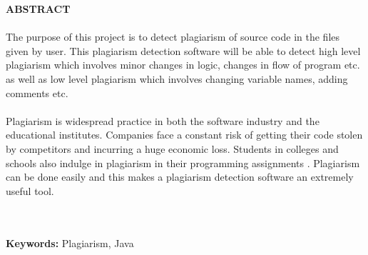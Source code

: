 \begin{center}
\thispagestyle{empty}
\vspace{2cm}
\LARGE{\textbf{ABSTRACT}}\\[1.0cm]
\end{center}
\thispagestyle{empty}
\large{\paragraph{}The purpose of this project is to detect plagiarism of source code in the files given by user. This plagiarism detection software will be able to detect high level plagiarism which involves minor changes in logic, changes in flow of program etc. as well as low level plagiarism which involves changing variable names, adding comments etc.
}


\large{\paragraph{}Plagiarism is widespread practice in both the software industry and the educational institutes. Companies face a constant risk of getting their code stolen by competitors and incurring a huge economic loss. Students in colleges and schools also indulge in plagiarism in their programming assignments . Plagiarism can be done easily and this makes a plagiarism detection software an extremely useful tool.}\\\\
\textbf{Keywords: }Plagiarism, Java